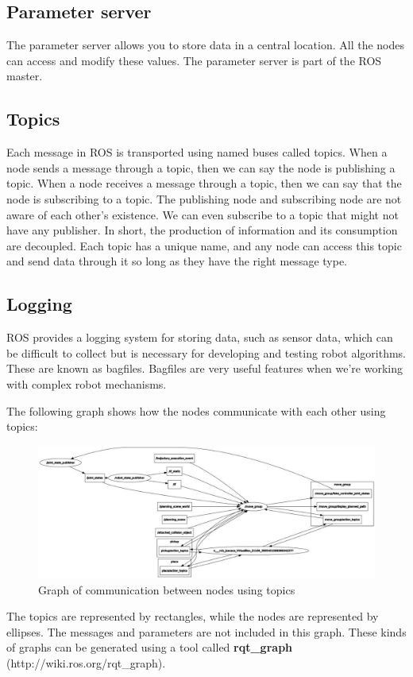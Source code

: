\documentclass[../../main]{subfiles}
\begin{document}
\subsection{Parameter server}
The parameter server allows you to store data in a central
location. All the nodes can access and modify these values. The parameter server is
part of the ROS master.
\subsection{Topics}
Each message in ROS is transported using named buses called topics. When
a node sends a message through a topic, then we can say the node is publishing a
topic. When a node receives a message through a topic, then we can say that the
node is subscribing to a topic. The publishing node and subscribing node are not
aware of each other's existence. We can even subscribe to a topic that might not
have any publisher. In short, the production of information and its consumption are
decoupled. Each topic has a unique name, and any node can access this topic and
send data through it so long as they have the right message type.
\subsection{Logging}
ROS provides a logging system for storing data, such as sensor data,
which can be difficult to collect but is necessary for developing and testing robot
algorithms. These are known as bagfiles. Bagfiles are very useful features when we're
working with complex robot mechanisms.

The following graph shows how the nodes communicate with each other using topics:

\begin{figure}[ht]
    \centering
    \includegraphics{img/rqt_graph.jpg}
    \caption{Graph of communication between nodes using topics}
\end{figure}
The topics are represented by rectangles, while the nodes are represented by ellipses. The messages and parameters are not included in this graph. These kinds of graphs can be generated using a tool called \textbf{rqt\_graph} (http://wiki.ros.org/rqt\_graph).
\end{document}
